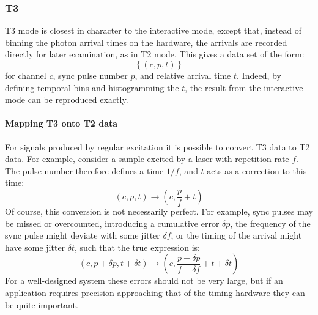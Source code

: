\documentclass{article}
\newcommand{\braces}[1]{\ensuremath{\left\lbrace #1 \right\rbrace}}
\newcommand{\parens}[1]{\ensuremath{\left( #1 \right)}}
\newcommand{\channel}{\ensuremath{c}}
\renewcommand{\time}{\ensuremath{t}}
\newcommand{\pulse}{\ensuremath{p}}
\newcommand{\reprate}{\ensuremath{f}}
\numberwithin{equation}{section}
\numberwithin{figure}{section}
\begin{document}
\subsubsection{T3}
\label{sec:t3}
T3 mode is closest in character to the interactive mode, except that, instead of binning the photon arrival times on the hardware, the arrivals are recorded directly for later examination, as in T2 mode. This gives a data set of the form:
\begin{equation}
\braces{\parens{\channel, \pulse, \time}}
\end{equation}
for channel \channel{}, sync pulse number \pulse{}, and relative arrival time \time{}. Indeed, by defining temporal bins and histogramming the \time{}, the result from the interactive mode can be reproduced exactly.

\paragraph{Mapping T3 onto T2 data}
\label{sec:t3_to_t2}
For signals produced by regular excitation it is possible to convert T3 data to T2 data. For example, consider a sample excited by a laser with repetition rate \reprate. The pulse number therefore defines a time $1/\reprate$, and \time{} acts as a correction to this time:
\begin{equation}
\parens{\channel, \pulse, \time} \rightarrow \parens{\channel, \frac{\pulse}{\reprate} + \time}
\end{equation}
Of course, this conversion is not necessarily perfect. For example, sync pulses may be missed or overcounted, introducing a cumulative error $\delta\pulse$, the frequency of the sync pulse might deviate with some jitter $\delta\reprate$, or the timing of the arrival might have some jitter $\delta\time$, such that the true expression is:
\begin{equation}
\parens{\channel, \pulse + \delta\pulse, \time + \delta\time}
      \rightarrow 
\parens{\channel, \frac{\pulse+\delta\pulse}{\reprate+\delta\reprate} + \time+\delta\time}
\end{equation}
For a well-designed system these errors should not be very large, but if an application requires precision approaching that of the timing hardware they can be quite important. 

%
\end{document}
